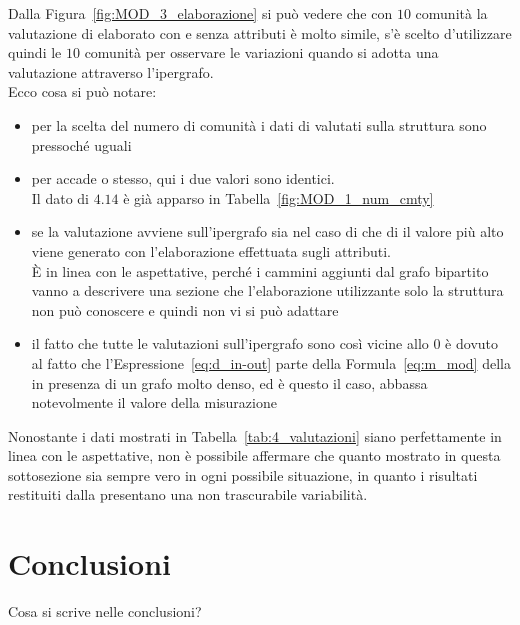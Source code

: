 %
Dalla Figura~\ref{fig:MOD_3_elaborazione} si può vedere che con $10$ comunità la valutazione di \cora elaborato con e senza attributi è molto simile, s'è scelto d'utilizzare quindi le $10$ comunità per osservare le variazioni quando si adotta una valutazione attraverso l'ipergrafo.\\
Ecco cosa si può notare:
\begin{itemize}
	\item per la scelta del numero di comunità i dati di \cora valutati sulla struttura sono pressoché uguali
	\item per \citeseer accade o stesso, qui i due valori sono identici.\\
	Il dato di $4.14$  è già apparso in Tabella~\ref{fig:MOD_1_num_cmty}
	\item se la valutazione avviene sull'ipergrafo sia nel caso di \cora che di \citeseer il valore più alto viene generato con l'elaborazione effettuata sugli attributi.\\
	È in linea con le aspettative, perché i cammini aggiunti dal grafo bipartito vanno a descrivere una sezione che l'elaborazione utilizzante solo la struttura non può conoscere e quindi non vi si può adattare
	\item il fatto che tutte le valutazioni sull'ipergrafo sono così vicine allo $0$ è dovuto al fatto che l'Espressione~\ref{eq:d_in-out} parte della Formula~\ref{eq:m_mod} della \mmod in presenza di un grafo molto denso, ed è questo il caso, abbassa notevolmente il valore della misurazione
\end{itemize}
%
Nonostante i dati mostrati in Tabella~\ref{tab:4_valutazioni} siano perfettamente in linea con le aspettative, non è possibile affermare che quanto mostrato in questa sottosezione sia sempre vero in ogni possibile situazione, in quanto i risultati restituiti dalla \mmod presentano una non trascurabile variabilità.



\chapter{Conclusioni}
Cosa si scrive nelle conclusioni?

%




